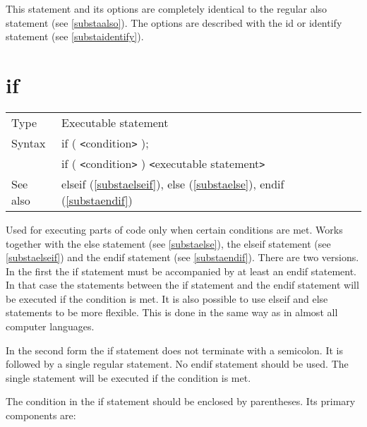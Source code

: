\noindent This statement and its options are completely 
identical to the regular also statement (see \ref{substaalso}). 
The options are described with the id or identify 
statement (see \ref{substaidentify}).
\vspace{10mm}

 
\section{if}
\label{substaif}

\noindent \begin{tabular}{ll}
Type & Executable statement\\
Syntax & if ( {\tt<}condition{\tt>} ); \\
       & if ( {\tt<}condition{\tt>} ) {\tt<}executable statement{\tt>}
\\ See also & elseif (\ref{substaelseif}),
              else (\ref{substaelse}),
              endif (\ref{substaendif})
\end{tabular} \vspace{4mm}

\noindent Used for executing parts of code only when certain 
conditions are met. Works together with the 
else statement (see \ref{substaelse}), the elseif 
statement (see \ref{substaelseif}) and the endif statement 
(see \ref{substaendif}). There are two versions. In the first the if 
statement must be accompanied by at least an endif statement. In that case 
the statements between the if statement and the endif statement will be 
executed if the condition is met. It is also possible to use elseif and 
else statements to be more flexible. This is done in the same way as in 
almost all computer languages.

\noindent In the second form the if statement does not terminate with a 
semicolon. It is followed by a single regular statement. 
No endif statement should be used. The single statement will be executed if 
the condition is met.

\noindent The condition in the if statement should be enclosed by 
parentheses. Its primary components are:


